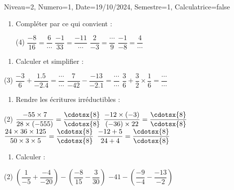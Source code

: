 \documentclass[a4paper,12pt]{article}
\begin{document}
\begin{Maquette}[DS]{Niveau=2, Numero=1, Date=19/10/2024, Semestre=1, Calculatrice=false}

\begin{exercice}
\begin{enumerate}
\item  Compléter par ce qui convient :
\begin{tasks}(4)
\task[]\(\dfrac{-8}{16}=\dfrac{6}{\cdots}\)
\task[] \(\dfrac{-1}{33}=\dfrac{-11}{\cdots}\)
\task[] \(\dfrac{2}{-3}=\dfrac{\cdots}{9} \)
\task[] \(\dfrac{-1}{-8}=\dfrac{4}{\cdots}\)
\end{tasks}
\end{enumerate}
\end{exercice}

\begin{exercice}
\begin{enumerate}
\item Calculer et simplifier :
\end{enumerate}
\begin{tasks}(3)
\task[] $\dfrac{-3}{6}+\dfrac{1.5}{-2.4}=\dfrac{\cdots}{\cdots}$
\task[] $\dfrac{7}{-42}-\dfrac{-13}{-2.1}=\dfrac{\cdots}{\cdots}$
\task[] $\dfrac{3}{6}+\dfrac{3}{2}\times \dfrac{1}{6}=\dfrac{\cdots}{\cdots}$
\end{tasks}
\end{exercice}


\begin{exercice}
\begin{enumerate}
\item Rendre les écritures irréductibles :
\end{enumerate}
\begin{tasks}(2)
\task[A=] \(\dfrac{-55\times7}{28\times(-555)} =\dfrac{\cdotsx{8}}{\cdotsx{8}}\)
\task[B=] \(\dfrac{-12\times(-3)}{(-36)\times22}=\dfrac{\cdotsx{8}}{\cdotsx{8}}\)
\task[C=] \(\dfrac{24\times36\times125}{50\times3\times5}=\dfrac{\cdotsx{8}}{\cdotsx{8}}\)
\task[D=] \(\dfrac{-12+5}{24+4}=\dfrac{\cdotsx{8}}{\cdotsx{8}}\)
\end{tasks}
\end{exercice}

\begin{exercice}
\begin{enumerate}
\item Calculer :
\end{enumerate}
\begin{tasks}(2)
\task[A=] $\left( \dfrac{1}{-5}+\dfrac{-4}{-20}\right) -\left(\dfrac{-8}{15}-\dfrac{3}{30}\right) $\newline
{}
\task[B=]$-41-\left( \dfrac{-9}{-4}-\dfrac{-13}{-2}\right)$\newline
{}
\end{tasks}
\end{exercice}


\end{Maquette}
\end{document}

